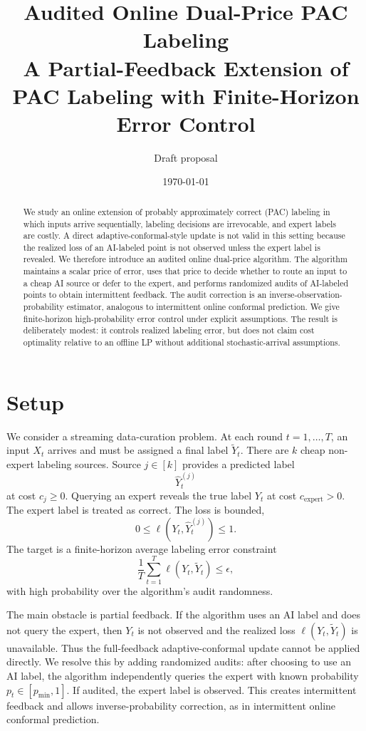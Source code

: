 \documentclass[11pt]{article}
\title{Audited Online Dual-Price PAC Labeling\\
\large A Partial-Feedback Extension of PAC Labeling with Finite-Horizon Error Control}
\author{Draft proposal}
\date{\today}
\newcommand{\1}{\mathbf{1}}
\newcommand{\Yhat}{\widehat Y}
\newcommand{\eps}{\epsilon}
\begin{document}
\maketitle

\begin{abstract}
We study an online extension of probably approximately correct (PAC) labeling in which inputs arrive sequentially, labeling decisions are irrevocable, and expert labels are costly. A direct adaptive-conformal-style update is not valid in this setting because the realized loss of an AI-labeled point is not observed unless the expert label is revealed. We therefore introduce an audited online dual-price algorithm. The algorithm maintains a scalar price of error, uses that price to decide whether to route an input to a cheap AI source or defer to the expert, and performs randomized audits of AI-labeled points to obtain intermittent feedback. The audit correction is an inverse-observation-probability estimator, analogous to intermittent online conformal prediction. We give finite-horizon high-probability error control under explicit assumptions. The result is deliberately modest: it controls realized labeling error, but does not claim cost optimality relative to an offline LP without additional stochastic-arrival assumptions.
\end{abstract}

\section{Setup}

We consider a streaming data-curation problem. At each round $t=1,\ldots,T$, an input $X_t$ arrives and must be assigned a final label $\widetilde Y_t$. There are $k$ cheap non-expert labeling sources. Source $j\in[k]$ provides a predicted label
\[
\Yhat_t^{(j)}
\]
at cost $c_j\ge 0$. Querying an expert reveals the true label $Y_t$ at cost $c_{\mathrm{expert}}>0$. The expert label is treated as correct. The loss is bounded,
\[
0\le \ell(Y_t,\Yhat_t^{(j)})\le 1.
\]
The target is a finite-horizon average labeling error constraint
\[
\frac{1}{T}\sum_{t=1}^T \ell(Y_t,\widetilde Y_t)\le \eps,
\]
with high probability over the algorithm's audit randomness.

The main obstacle is partial feedback. If the algorithm uses an AI label and does not query the expert, then $Y_t$ is not observed and the realized loss $\ell(Y_t,\widetilde Y_t)$ is unavailable. Thus the full-feedback adaptive-conformal update cannot be applied directly. We resolve this by adding randomized audits: after choosing to use an AI label, the algorithm independently queries the expert with known probability $p_t\in[p_{\min},1]$. If audited, the expert label is observed. This creates intermittent feedback and allows inverse-probability correction, as in intermittent online conformal prediction.
\end{document}
